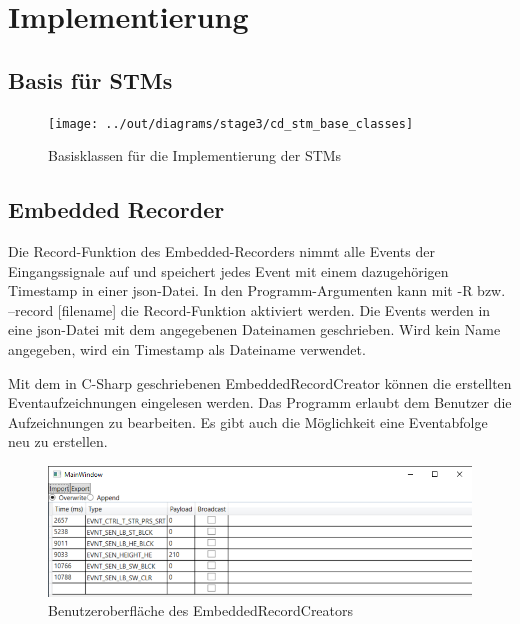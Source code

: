\chapter{Implementierung}\label{ch:implementierung}


\section{Basis für STMs}\label{sec:basis-fuer-stms}

\begin{figure}[h]
    \centering
    \texttt{[image: ../out/diagrams/stage3/cd\_stm\_base\_classes]}
    \caption{Basisklassen für die Implementierung der STMs}
    \label{fig:cd-stm-base}
\end{figure}



\section{Embedded Recorder}\label{sec:embedded-recorder}

Die Record-Funktion des Embedded-Recorders nimmt alle Events der Eingangssignale auf und
speichert jedes Event mit einem dazugehörigen Timestamp in einer json-Datei.
In den Programm-Argumenten kann mit -R bzw. --record [filename] die Record-Funktion aktiviert werden.
Die Events werden in eine json-Datei mit dem angegebenen Dateinamen geschrieben.
Wird kein Name angegeben, wird ein Timestamp als Dateiname verwendet.

Mit dem in C-Sharp geschriebenen EmbeddedRecordCreator können die erstellten Eventaufzeichnungen eingelesen werden.
Das Programm erlaubt dem Benutzer die Aufzeichnungen zu bearbeiten.
Es gibt auch die Möglichkeit eine Eventabfolge neu zu erstellen.

\begin{figure}[h]
    \centering
    \includegraphics[scale = 0.7]{anhang/EmbeddedRecordCreator.PNG}
    \caption{Benutzeroberfläche des EmbeddedRecordCreators}
    \label{fig:embedded-record-creator}
\end{figure}

